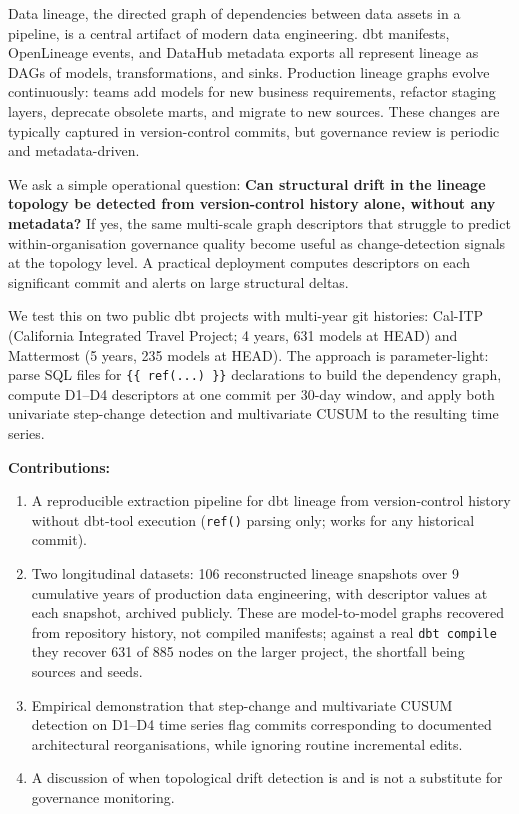\documentclass[11pt,a4paper]{article}
\begin{document}
Data lineage, the directed graph of dependencies between data
assets in a pipeline, is a central artifact of modern data
engineering. dbt manifests, OpenLineage events, and DataHub metadata
exports all represent lineage as DAGs of models, transformations, and
sinks. Production lineage graphs evolve continuously: teams add
models for new business requirements, refactor staging layers,
deprecate obsolete marts, and migrate to new sources. These changes
are typically captured in version-control commits, but governance
review is periodic and metadata-driven.

We ask a simple operational question: \textbf{Can structural drift in
the lineage topology be detected from version-control history alone,
without any metadata?} If yes, the same multi-scale graph descriptors
that struggle to predict within-organisation governance quality
\citep{hari2026descriptors} become useful as change-detection
signals at the topology level. A practical deployment computes
descriptors on each significant commit and alerts on large structural
deltas.

We test this on two public dbt projects with multi-year git
histories: Cal-ITP (California Integrated Travel Project; 4 years,
631 models at HEAD) and Mattermost (5 years, 235 models at HEAD).
The approach is parameter-light: parse SQL files for
\texttt{\{\{ ref(...) \}\}} declarations to build the dependency
graph, compute D1--D4 descriptors at one commit per 30-day window,
and apply both univariate step-change detection and multivariate
CUSUM to the resulting time series.

\textbf{Contributions:}
\begin{enumerate}
  \item A reproducible extraction pipeline for dbt lineage from
        version-control history without dbt-tool execution
        (\texttt{ref()} parsing only; works for any historical
        commit).
  \item Two longitudinal datasets: 106 reconstructed lineage snapshots
        over 9 cumulative years of production data engineering, with
        descriptor values at each snapshot, archived publicly. These
        are model-to-model graphs recovered from repository history,
        not compiled manifests; against a real \texttt{dbt compile}
        they recover 631 of 885 nodes on the larger project, the
        shortfall being sources and seeds.
  \item Empirical demonstration that step-change and multivariate
        CUSUM detection on D1--D4 time series flag commits
        corresponding to documented architectural reorganisations,
        while ignoring routine incremental edits.
  \item A discussion of when topological drift detection is and is
        not a substitute for governance monitoring.
\end{enumerate}
\end{document}
